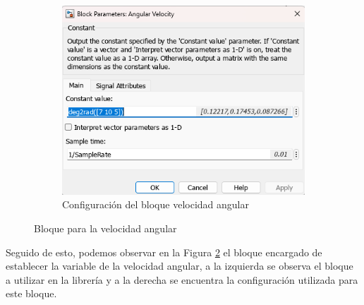\begin{figure}[htbp]
\begin{subfigure}[b]{0.45\textwidth}
        \includegraphics[width=\textwidth]{fig/Capitulo5/Caso_de_estudio_IMU/Generador_de_archivos/configuracion_bloque_velocidad_angular.png}
        \caption{Configuración del bloque velocidad angular}
        \label{fig:lib_bloques_config_angular_velocity}
    \end{subfigure}
    \caption{Bloque para la velocidad angular}
    \label{fig:angular_velocity_block_simulink}
\end{figure}

Seguido de esto, podemos observar en la Figura \ref{fig:angular_velocity_block_simulink} el bloque encargado de establecer la variable de la velocidad angular, a la izquierda se observa el bloque a utilizar en la librería y a la derecha se encuentra la configuración utilizada para este bloque. 

